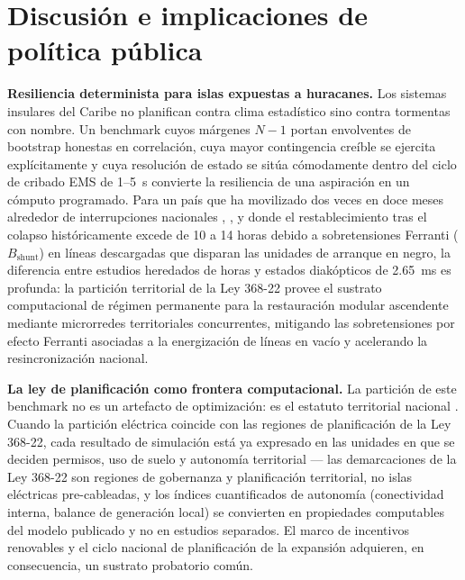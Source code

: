 \section{Discusión e implicaciones de política pública}
\label{sec:discussion}

\textbf{Resiliencia determinista para islas expuestas a huracanes.} Los sistemas insulares del Caribe no planifican contra clima estadístico sino contra tormentas con nombre. Un benchmark cuyos márgenes $N-1$ portan envolventes de bootstrap honestas en correlación, cuya mayor contingencia creíble se ejercita explícitamente y cuya resolución de estado se sitúa cómodamente dentro del ciclo de cribado EMS de 1--5~s convierte la resiliencia de una aspiración en un cómputo programado. Para un país que ha movilizado dos veces en doce meses alrededor de interrupciones nacionales \cite{ocseni}, \cite{diarioLibreHainamosa_2026}, y donde el restablecimiento tras el colapso históricamente excede de 10 a 14 horas debido a sobretensiones Ferranti ($B_{\mathrm{shunt}}$) en líneas descargadas que disparan las unidades de arranque en negro, la diferencia entre estudios heredados de horas y estados diakópticos de 2.65~ms es profunda: la partición territorial de la Ley 368-22 provee el sustrato computacional de régimen permanente para la restauración modular ascendente mediante microrredes territoriales concurrentes, mitigando las sobretensiones por efecto Ferranti asociadas a la energización de líneas en vacío y acelerando la resincronización nacional.

\textbf{La ley de planificación como frontera computacional.} La partición de este benchmark no es un artefacto de optimización: es el estatuto territorial nacional \cite{ley368}. Cuando la partición eléctrica coincide con las regiones de planificación de la Ley 368-22, cada resultado de simulación está ya expresado en las unidades en que se deciden permisos, uso de suelo y autonomía territorial --- las demarcaciones de la Ley 368-22 son regiones de gobernanza y planificación territorial, no islas eléctricas pre-cableadas, y los índices cuantificados de autonomía (conectividad interna, balance de generación local) se convierten en propiedades computables del modelo publicado y no en estudios separados. El marco de incentivos renovables \cite{ley57} y el ciclo nacional de planificación de la expansión \cite{cne2022} adquieren, en consecuencia, un sustrato probatorio común.


